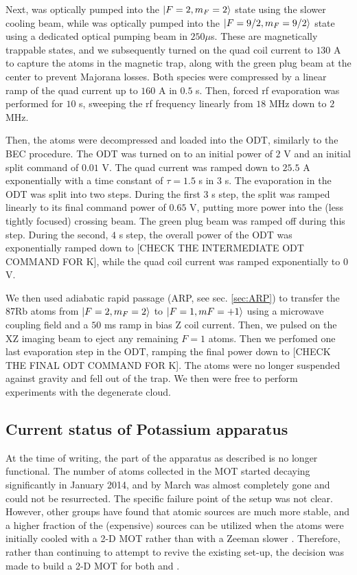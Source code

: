 Next, \Rb{} was optically pumped into the $\mathinner{|{F=2, m_F=2}\rangle}$ state using the slower cooling beam, while \K{} was optically pumped into the $\mathinner{|{F=9/2,m_F=9/2}\rangle}$ state using a dedicated optical pumping beam in $250 \mu$s. These are magnetically trappable states, and we subsequently turned on the quad coil current to $130$ A to capture the atoms in the magnetic trap, along with the green plug beam at the center to prevent Majorana losses. Both species were compressed by a linear ramp of the quad current up to $160$ A in $0.5$ s. Then, forced rf evaporation was performed for $10$ s, sweeping the rf frequency linearly from $18$ MHz down to $2$ MHz.

Then, the atoms were decompressed and loaded into the ODT, similarly to the BEC procedure. The ODT was turned on to an initial power of $2$ V and an initial split command of $0.01$ V. The quad current was ramped down to $25.5$ A exponentially with a time constant of $\tau=1.5$ s in $3$ s. The evaporation in the ODT was split into two steps. During the first $3$ s step, the split was ramped linearly to its final command power of $0.65$ V, putting more power into the (less tightly focused) crossing beam. The green plug beam was ramped off during this step. During the second, $4$ s step, the overall power of the ODT was exponentially ramped down to [CHECK THE INTERMEDIATE ODT COMMAND FOR K], while the quad coil current was ramped exponentially to $0$ V.


We then used adiabatic rapid passage (ARP, see sec. \ref{sec:ARP}) to transfer the 87Rb atoms from $\mathinner{|{F = 2,m_F = 2}\rangle}$ to $\mathinner{|{F = 1,mF = +1}\rangle}$ using a microwave coupling field and a $50$ ms ramp in bias Z coil current. Then, we pulsed on the XZ imaging beam to eject any remaining $F=1$ atoms. Then we perfomed one last evaporation step in the ODT, ramping the final power down to [CHECK THE FINAL ODT COMMAND FOR K]. The \Rb{} atoms were no longer suspended against gravity and fell out of the trap. We then were free to perform experiments with the degenerate \K{} cloud. 

\subsection{Current status of Potassium apparatus}

At the time of writing, the \K{} part of the apparatus as described is no longer functional. The number of \K{} atoms collected in the MOT started decaying significantly in January 2014, and by March was almost completely gone and could not be resurrected. The specific failure point of the setup was not clear. However, other groups have found that atomic sources are much more stable, and a higher fraction of the (expensive) \K{} sources can be utilized when the atoms were initially cooled with a 2-D MOT rather than with a Zeeman slower \cite{Catani2006,UehlingerThesis,Pedrozo2016}. Therefore, rather than continuing to attempt to revive the existing set-up, the decision was made to build a 2-D MOT for both \K{} and \Rb{}.

